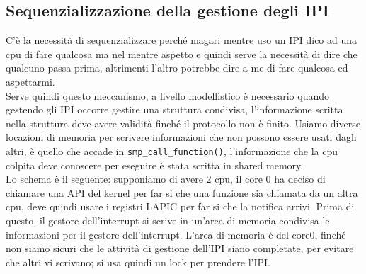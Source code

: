\documentclass[12pt, oneside]{extbook}
\begin{document}
\subsection{Sequenzializzazione della gestione degli IPI}
C'è la necessità di sequenzializzare perché magari mentre uso un IPI dico ad una cpu di fare qualcosa ma nel mentre aspetto e quindi serve la necessità di dire che qualcuno passa prima, altrimenti l'altro potrebbe dire a me di fare qualcosa ed aspettarmi.\\Serve quindi questo meccanismo, a livello modellistico è necessario quando gestendo gli IPI occorre gestire una struttura condivisa, l'informazione scritta nella struttura deve avere validità finché il protocollo non è finito. Usiamo diverse locazioni di memoria per scrivere informazioni che non possono essere usati dagli altri, è quello che accade in \texttt{smp\_call\_function()}, l'informazione che la cpu colpita deve conoscere per eseguire è stata scritta in shared memory.\\ Lo schema è il seguente:
supponiamo di avere 2 cpu, il core 0 ha deciso di chiamare una API del kernel per far si che una funzione sia chiamata da un altra cpu, deve quindi usare i registri LAPIC per far si che la notifica arrivi. Prima di questo, il gestore dell'interrupt si scrive in un'area di memoria condivisa le informazioni per il gestore dell'interrupt. L'area di memoria è del core0, finché non siamo sicuri che le attività di gestione dell'IPI siano completate, per evitare che altri vi scrivano; si usa quindi un lock per prendere l'IPI.
\end{document}
